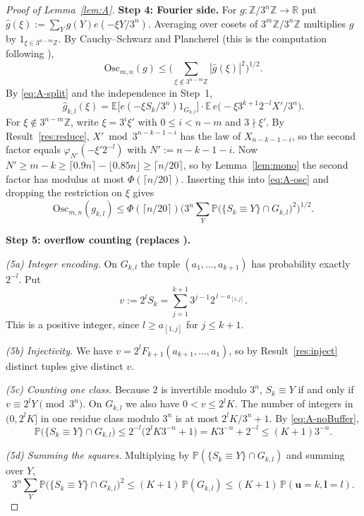 \documentclass[11pt]{amsart}
\theoremstyle{remark}
\newcommand{\E}{\mathbb{E}}
\renewcommand{\P}{\mathbb{P}}
\newcommand{\Z}{\mathbb{Z}}
\newcommand{\Osc}{\mathrm{Osc}}
\newcommand{\T}[1]{\cite[#1]{Tao22}}   %
\theoremstyle{plain}
\begin{document}
\begin{proof}[Proof of Lemma~\ref{lem:A}]
\textbf{Step 4: Fourier side.} For $g\colon\Z/3^n\Z\to\mathbb R$ put $\hat g(\xi):=\sum_Yg(Y)e(-\xi Y/3^n)$. Averaging over cosets of $3^m\Z/3^n\Z$ multiplies $\hat g$ by $1_{\xi\in3^{n-m}\Z}$. By Cauchy--Schwarz and Plancherel (this is the computation following \T{(6.10)}),
\begin{equation}\label{eq:A-osc}
\Osc_{m,n}(g)\le\Big(\sum_{\xi\notin3^{n-m}\Z}|\hat g(\xi)|^2\Big)^{1/2}.
\end{equation}
By \eqref{eq:A-split} and the independence in Step~1,
\[
\hat g_{k,l}(\xi)=\E\big[e(-\xi S_k/3^n)1_{G_{k,l}}\big]\cdot\E\,e\big(-\xi3^{k+1}2^{-l}X'/3^n\big).
\]
For $\xi\notin3^{n-m}\Z$, write $\xi=3^i\xi'$ with $0\le i<n-m$ and $3\nmid\xi'$. By Result~\ref{res:reduce}, $X'\bmod3^{n-k-1-i}$ has the law of $X_{n-k-1-i}$, so the second factor equals $\varphi_{N'}(-\xi'2^{-l})$ with $N':=n-k-1-i$. Now $N'\ge m-k\ge\lceil0.9n\rceil-\lfloor0.85n\rfloor\ge\lceil n/20\rceil$, so by Lemma~\ref{lem:mono} the second factor has modulus at most $\Phi(\lceil n/20\rceil)$. Inserting this into \eqref{eq:A-osc} and dropping the restriction on $\xi$ gives
\begin{equation}\label{eq:A-fourier}
\Osc_{m,n}(g_{k,l})\le\Phi(\lceil n/20\rceil)\Big(3^n\sum_{Y}\P\big(\{S_k\equiv Y\}\cap G_{k,l}\big)^2\Big)^{1/2}.
\end{equation}

\textbf{Step 5: overflow counting (replaces \T{Corollary 6.3}).}

\emph{(5a) Integer encoding.} On $G_{k,l}$ the tuple $(a_1,\dots,a_{k+1})$ has probability exactly $2^{-l}$. Put
\[
v:=2^lS_k=\sum_{j=1}^{k+1}3^{j-1}2^{\,l-a_{[1,j]}} .
\]
This is a positive integer, since $l\ge a_{[1,j]}$ for $j\le k+1$.

\emph{(5b) Injectivity.} We have $v=2^lF_{k+1}(a_{k+1},\dots,a_1)$, so by Result~\ref{res:inject} distinct tuples give distinct $v$.

\emph{(5c) Counting one class.} Because $2$ is invertible modulo $3^n$, $S_k\equiv Y$ if and only if $v\equiv2^lY\pmod{3^n}$. On $G_{k,l}$ we also have $0<v\le2^lK$. The number of integers in $(0,2^lK]$ in one residue class modulo $3^n$ is at most $2^lK/3^n+1$. By \eqref{eq:A-noBuffer},
\[
\P\big(\{S_k\equiv Y\}\cap G_{k,l}\big)\le2^{-l}\big(2^lK3^{-n}+1\big)=K3^{-n}+2^{-l}\le(K+1)3^{-n}.
\]

\emph{(5d) Summing the squares.} Multiplying by $\P(\{S_k\equiv Y\}\cap G_{k,l})$ and summing over $Y$,
\[
3^n\sum_Y\P\big(\{S_k\equiv Y\}\cap G_{k,l}\big)^2\le(K+1)\,\P(G_{k,l})\le(K+1)\,\P(\mathbf u=k,\mathbf l=l).
\]


\end{proof}
\end{document}

